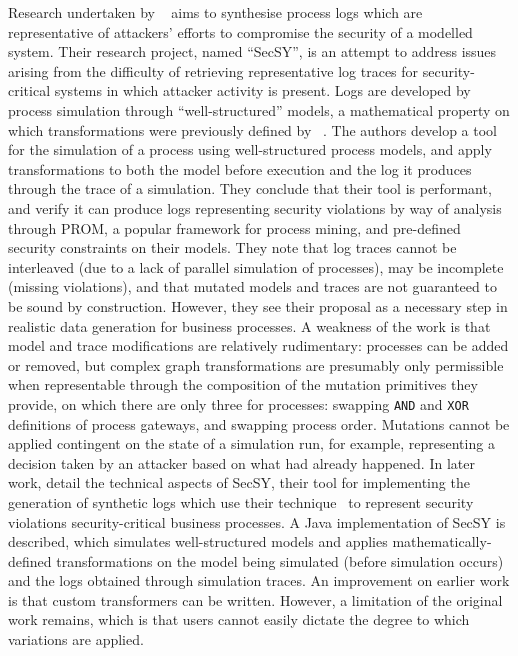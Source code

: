 Research undertaken by \citeauthor{stocker2013secsy}~\cite{stocker2013secsy}
aims to synthesise process logs which are representative of attackers' efforts
to compromise the security of a modelled system. Their research project, named
``SecSY'', is an attempt to address issues arising from the difficulty of
retrieving representative log traces for security-critical systems in which
attacker activity is present. Logs are developed by process simulation through
``well-structured'' models, a mathematical property on which transformations
were previously defined by
\citeauthor{vanhatalo2009refined}~\cite{vanhatalo2009refined}. The authors
develop a tool for the simulation of a process using well-structured process
models, and apply transformations to both the model before execution and the log
it produces through the trace of a simulation. They conclude that their tool is
performant, and verify it can produce logs representing security violations by
way of analysis through PROM, a popular framework for process mining, and
pre-defined security constraints on their models. They note that log traces
cannot be interleaved (due to a lack of parallel simulation of processes), may
be incomplete (missing violations), and that mutated models and traces are not
guaranteed to be sound by construction. However, they see their proposal as a
necessary step in realistic data generation for business processes. A weakness
of the work is that model and trace modifications are relatively rudimentary:
processes can be added or removed, but complex graph transformations are
presumably only permissible when representable through the composition of the
mutation primitives they provide, on which there are only three for processes:
swapping \lstinline{AND} and \lstinline{XOR} definitions of process gateways, and swapping process
order. Mutations cannot be applied contingent on the state of a simulation run,
for example, representing a decision taken by an attacker based on what had
already happened. In later work, \citeauthor{stocker2014secsy} detail the
technical aspects of SecSY, their tool for implementing the generation of
synthetic logs which use their technique~\cite{stocker2013secsy} to represent
security violations security-critical business processes. A Java implementation
of SecSY is described, which simulates well-structured models and applies
mathematically-defined transformations on the model being simulated (before
simulation occurs) and the logs obtained through simulation traces. An
improvement on earlier work is that custom transformers can be written. However,
a limitation of the original work remains, which is that users cannot easily
dictate the degree to which variations are applied.


